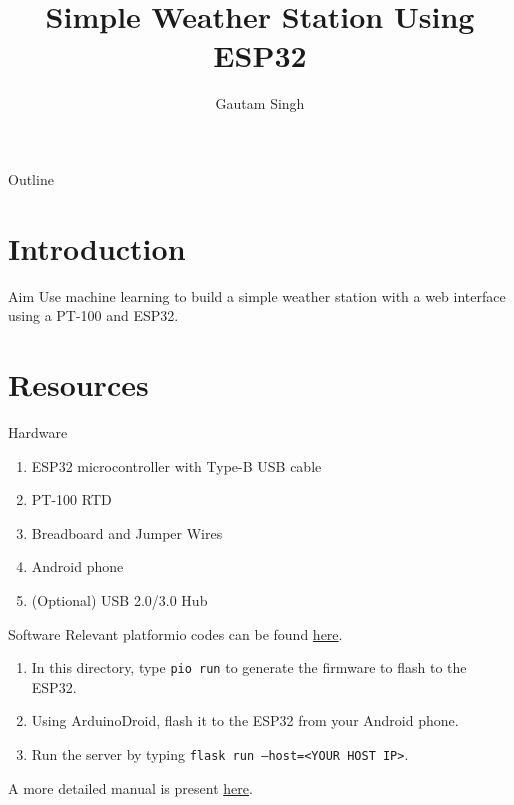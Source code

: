 \documentclass{beamer}
\title[ESP32 Weather Station]{Simple Weather Station Using ESP32}
\author{Gautam Singh}
\theoremstyle{remark}
\begin{document}
\begin{frame}
    \titlepage 
\end{frame}

\logo{}

\begin{frame}{Outline}
    \tableofcontents
\end{frame}

\section{Introduction}
\begin{frame}{Aim}
    Use machine learning to build a simple weather station  with a web interface
    using a PT-100 and ESP32.
\end{frame}

\section{Resources}
\begin{frame}{Hardware}
    \begin{enumerate}
        \item ESP32 microcontroller with Type-B USB cable
        \item PT-100 RTD
        \item Breadboard and Jumper Wires
        \item Android phone
        \item (Optional) USB 2.0/3.0 Hub
    \end{enumerate}
\end{frame}

\begin{frame}[label=software]{Software}
Relevant platformio codes can be found 
\href{https://github.com/goats-9/ee2802-assignments/tree/main/pt100/esp32/codes/esp32}{here}.
\begin{enumerate}
    \item In this directory, type \texttt{pio run} to generate the firmware to
    flash to the ESP32.
    \item Using ArduinoDroid, flash it to the ESP32 from your Android phone.
    \item Run the server by typing \texttt{flask run --host=<YOUR HOST IP>}.
\end{enumerate}
A more detailed manual is present \href{https://github.com/goats-9/ee2802-assignments/tree/main/pt100/esp32/main.pdf}{here}.
\end{frame}
\end{document}
